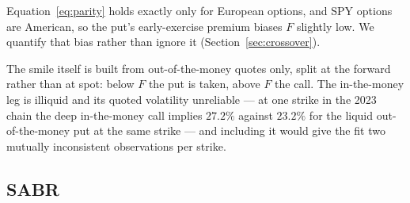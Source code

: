 \documentclass[11pt]{article}
\begin{document}
Equation~\eqref{eq:parity} holds exactly only for European options, and SPY options are
American, so the put's early-exercise premium biases $F$ slightly low. We quantify that
bias rather than ignore it (Section~\ref{sec:crossover}).

The smile itself is built from out-of-the-money quotes only, split at the forward rather
than at spot: below $F$ the put is taken, above $F$ the call. The in-the-money leg is
illiquid and its quoted volatility unreliable --- at one strike in the 2023 chain the
deep in-the-money call implies $27.2\%$ against $23.2\%$ for the liquid out-of-the-money
put at the same strike --- and including it would give the fit two mutually inconsistent
observations per strike.

\subsection{SABR}
\end{document}
